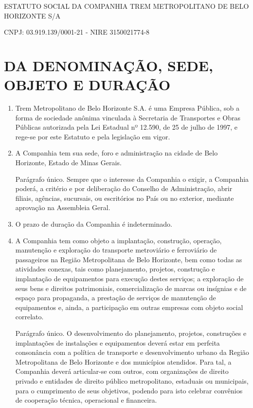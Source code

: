 \documentclass[a4paper,11pt]{report}
\begin{document}

\begin{center}
ESTATUTO SOCIAL DA COMPANHIA TREM METROPOLITANO DE BELO HORIZONTE S/A

CNPJ: 03.919.139/0001-21 - NIRE 3150021774-8
\end{center}

\chapter{DA DENOMINAÇÃO, SEDE, OBJETO E DURAÇÃO}

\begin{enumerate}[resume, label=Art. \arabic*]

\item Trem Metropolitano de Belo Horizonte S.A. é uma Empresa Pública, sob a forma de sociedade anônima vinculada à Secretaria de Transportes e Obras Públicas autorizada pela Lei Estadual nº 12.590, de 25 de julho de 1997, e rege-se por este Estatuto e pela legislação em vigor.

\item A Companhia tem sua sede, foro e administração na cidade de Belo Horizonte, Estado de Minas Gerais.

Parágrafo único. Sempre que o interesse da Companhia o exigir, a Companhia poderá, a critério e por deliberação do Conselho de Administração, abrir filiais, agências, sucursais, ou escritórios no País ou no exterior, mediante aprovação na Assembleia Geral.

\item O prazo de duração da Companhia é indeterminado.

\item A Companhia tem como objeto a implantação, construção, operação, manutenção e exploração do transporte metroviário e ferroviário de passageiros na Região Metropolitana de Belo Horizonte, bem como todas as atividades conexas, tais como planejamento, projetos, construção e implantação de equipamentos para execução destes serviços; a exploração de seus bens e direitos patrimoniais, comercialização de marcas ou insígnias e de espaço para propaganda, a prestação de serviços de manutenção de equipamentos e, ainda, a participação em outras empresas com objeto social correlato.

Parágrafo único. O desenvolvimento do planejamento, projetos, construções e implantações de instalações e equipamentos deverá estar em perfeita consonância com a política de transporte e desenvolvimento urbano da Região Metropolitana de Belo Horizonte e dos municípios atendidos. Para tal, a Companhia deverá articular-se com outros, com organizações de direito privado e entidades de direito público metropolitano, estaduais ou municipais, para o cumprimento de seus objetivos, podendo para isto celebrar convênios de cooperação técnica, operacional e financeira.


\end{enumerate}
\end{document}

